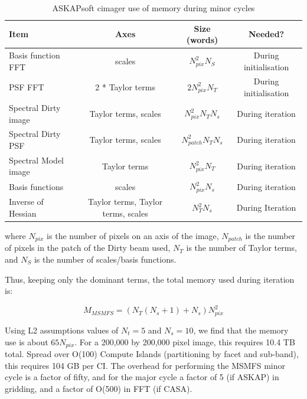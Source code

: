 \documentclass[11pt,a4paper,variablewidth]{article}
\begin{document}
\begin{table}[tbh]
\caption{ASKAPsoft cimager use of memory during minor cycles}\label{tab:askapmemory}

\begin{tabular}{|l|c|c|c|}
\hline
Item & Axes & Size (words) & Needed? \\
\hline
Basis function FFT & scales & $N_{pix}^2 N_S $ & During initialisation \\
PSF FFT & 2 * Taylor terms & $2 N_{pix}^2 N_T $ & During initialisation \\
Spectral Dirty image & Taylor terms, scales & $N_{pix}^2 N_T N_s$ & During iteration \\
Spectral Dirty PSF & Taylor terms, scales & $N_{patch}^2 N_T N_s$ & During iteration \\
Spectral Model image & Taylor terms & $N_{pix}^2 N_T $ & During iteration \\	
Basis functions & scales & $N_{pix}^2 N_s$ & During iteration \\
Inverse of Hessian & Taylor terms, Taylor terms, scales & $N^2_T N_s$ & During Iteration \\
\hline
\end{tabular}	
\end{table}

where $N_{pix}$ is the number of pixels on an axis of the image, $N_{patch}$ is the number of pixels in the patch of the Dirty beam used, $N_T$ is the number of Taylor terms, and $N_S$ is the number of scales/basis functions.

Thus, keeping only the dominant terms, the total memory used during iteration is: 

\begin{equation}
M_{MSMFS} = (N_T (N_s + 1) + N_s) N_{pix}^2 
\end{equation}

Using L2 assumptions values of $N_t=5$ and $N_s=10$, we find that the memory use is about $65 N_{pix}$. For a 200,000 by 200,000 pixel image, this requires 10.4 TB total. Spread over O(100) Compute Islands (partitioning by facet and sub-band), this requires 104 GB per CI. The overhead for performing the MSMFS minor cycle is a factor of fifty, and for the major cycle a factor of 5 (if ASKAP) in gridding, and a factor of O(500) in FFT (if CASA).


%
%
%
%
\end{document}
